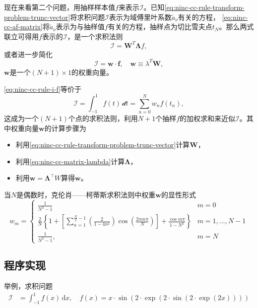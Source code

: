 现在来看第二个问题，用抽样样本值$f$来表示$\mathcal{I}$。已知\eqref{eq:ninc-cc-rule-transform-problem-trunc-vector}将求积问题$\mathcal{I}$表示为域傅里叶系数$\tilde{a}_{\nu}$有关的方程，
\eqref{eq:ninc-cc-af-matrix}将$\tilde{a}_{\nu}$表示为与抽样值$f$有关的方程，抽样点为切比雪夫点$t_{N}$。那么两式联立可得用$f$表示的$\mathcal{I}$，是一个求积法则
\begin{equation*}
  \mathcal{I} = \bm{W}^{T} \bm{\Lambda} f,
\end{equation*}
或者进一步简化
\begin{equation}
  \label{eq:ninc-cc-rule-i-f}
  \mathcal{I} = \bm{w} \cdot \bm{f}, \quad \bm{w} \equiv \lambda^{T} \bm{W},
\end{equation}
$\bm{w}$是一个$\left( N + 1 \right) \times 1$的权重向量。

\eqref{eq:ninc-cc-rule-i-f}等价于
\begin{equation}
  \label{eq:ninc-cc-rule-i-f-extend}
  \mathcal{I} = \int_{-1}^{1} f(t) \, \mathcal{d}t = \sum_{n=0}^{N} w_{n} f \left( t_{n} \right),
\end{equation}
这成为一个$(N+1)$个点的求积法则，利用$N+1$个抽样$f$的加权求和来近似$\mathcal{I}$。其中权重向量$\bm{w}$的计算步骤为
\begin{itemize}
  \item 利用\eqref{eq:ninc-cc-rule-transform-problem-trunc-vector}计算$\bm{W}$，
  \item 利用\eqref{eq:ninc-cc-matrix-lambda}计算$\bm{\Lambda}$，
  \item 利用$\bm{w} = \bm{\Lambda}^{\top} W$算得$\bm{w}$。
\end{itemize}

当$N$是偶数时，克伦肖——柯蒂斯求积法则中权重$\bm{w}$的显性形式
\begin{equation}
  w_{m} = \begin{cases}
  \frac{1}{N^{2} -1} & m=0 \\
  \frac{2}{N} \left\{
  1 +
  \left[
  \sum_{n=1}^{\frac{N}{2} - 1} \left( \frac{2}{1 - 4 n^{2}} \right)
  \cos \left( \frac{2 m n \pi }{N} \right)
  \right]
  + \frac{\cos m \pi}{1 - N^{2}}
  \right\} & m = 1,\ldots,N-1 \\
  \frac{1}{N^{2} - 1}, & m = N
  \end{cases}
\end{equation}

\subsection{程序实现}
举例，求积问题
\begin{equation*}
\begin{split}
    \mathcal{I} & = \int_{-1}^{1} f(x) \, \mathrm{d} x, \quad  f(x) = x \cdot \sin \left(
    2 \cdot \exp \left( 2 \cdot \sin
    \left( 2 \cdot \exp \left( 2 x \right)\right)
    \right)
    \right)
\end{split}
\end{equation*}

